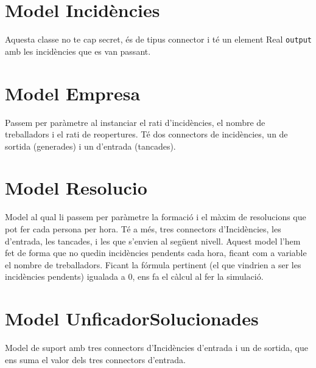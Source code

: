 \documentclass[8pt]{beamer}
\begin{document}
\section{Model Incidències}
\begin{frame}


Aquesta classe no te cap secret, és de tipus connector i té un element Real \texttt{output} amb les incidències que es van passant.
\end{frame}

\section{Model Empresa}
\begin{frame}

Passem per paràmetre al instanciar el rati d'incidències, el nombre de treballadors i el rati de reopertures. Té dos connectors de incidències, un de sortida (generades) i un d'entrada (tancades).
\end{frame}

\section{Model Resolucio}
\begin{frame}

 
Model al qual li passem per paràmetre la formació i el màxim de resolucions que pot fer cada persona per hora. Té a més, tres connectors d'Incidències, les d'entrada, les tancades, i les que s'envien al següent nivell.
Aquest model l'hem fet de forma que no quedin incidències pendents cada hora, ficant com a variable el nombre de treballadors. 
Ficant la fórmula pertinent (el que vindrien a ser les incidències pendents) igualada a 0, ens fa el càlcul al fer la simulació.
\end{frame}

\section{Model UnficadorSolucionades}
\begin{frame}


Model de suport amb tres connectors d'Incidències d'entrada i un de sortida, que ens suma el valor dels tres connectors d'entrada.
\end{frame}
\end{document}
